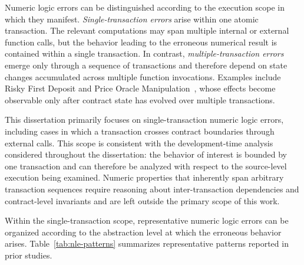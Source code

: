 \documentclass[11pt,oneside]{report}
\theoremstyle{plain}
\theoremstyle{definition}
\theoremstyle{remark}
\begin{document}
Numeric logic errors can be distinguished according to the execution scope in which they manifest.
\textit{Single-transaction errors} arise within one atomic transaction.
The relevant computations may span multiple internal or external function calls, but the behavior leading to the erroneous numerical result is contained within a single transaction.
In contrast, \textit{multiple-transaction errors} emerge only through a sequence of transactions and therefore depend on state changes accumulated across multiple function invocations.
Examples include Risky First Deposit and Price Oracle Manipulation~\citep{gptscan,exploitablebugs}, whose effects become observable only after contract state has evolved over multiple transactions.

This dissertation primarily focuses on single-transaction numeric logic errors, including cases in which a transaction crosses contract boundaries through external calls.
This scope is consistent with the development-time analysis considered throughout the dissertation: the behavior of interest is bounded by one transaction and can therefore be analyzed with respect to the source-level execution being examined.
Numeric properties that inherently span arbitrary transaction sequences require reasoning about inter-transaction dependencies and contract-level invariants and are left outside the primary scope of this work.

Within the single-transaction scope, representative numeric logic errors can be organized according to the abstraction level at which the erroneous behavior arises.
Table~\ref{tab:nle-patterns} summarizes representative patterns reported in prior studies.
\end{document}
